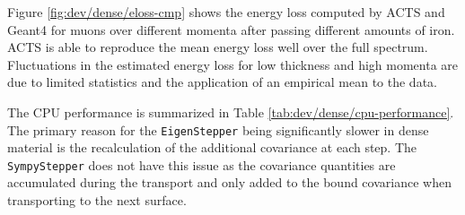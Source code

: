Figure \ref{fig:dev/dense/eloss-cmp} shows the energy loss computed by ACTS and Geant4 for muons over different momenta after passing different amounts of iron. ACTS is able to reproduce the mean energy loss well over the full spectrum. Fluctuations in the estimated energy loss for low thickness and high momenta are due to limited statistics and the application of an empirical mean to the data.



The CPU performance is summarized in Table \ref{tab:dev/dense/cpu-performance}. The primary reason for the \texttt{EigenStepper} being significantly slower in dense material is the recalculation of the additional covariance at each step. The \texttt{SympyStepper} does not have this issue as the covariance quantities are accumulated during the transport and only added to the bound covariance when transporting to the next surface.
